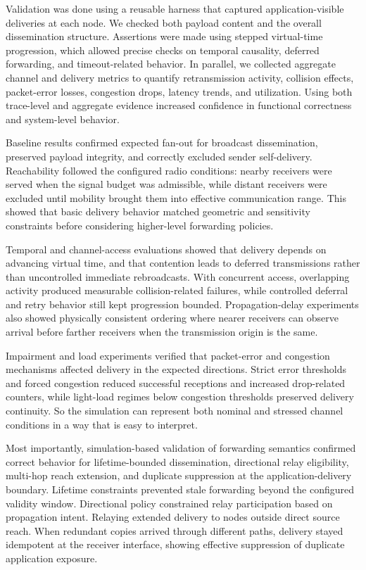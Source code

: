 Validation was done using a reusable harness that captured application-visible deliveries at each node. We
checked both payload content and the overall dissemination structure. Assertions were made using stepped
virtual-time progression, which allowed precise checks on temporal causality, deferred forwarding, and
timeout-related behavior. In parallel, we collected aggregate channel and delivery metrics to quantify
retransmission activity, collision effects, packet-error losses, congestion drops, latency trends, and
utilization. Using both trace-level and aggregate evidence increased confidence in functional correctness and
system-level behavior.

Baseline results confirmed expected fan-out for broadcast dissemination, preserved payload integrity, and
correctly excluded sender self-delivery. Reachability followed the configured radio conditions: nearby
receivers were served when the signal budget was admissible, while distant receivers were excluded until
mobility brought them into effective communication range. This showed that basic delivery behavior matched
geometric and sensitivity constraints before considering higher-level forwarding policies.

Temporal and channel-access evaluations showed that delivery depends on advancing virtual time, and that
contention leads to deferred transmissions rather than uncontrolled immediate rebroadcasts. With concurrent
access, overlapping activity produced measurable collision-related failures, while controlled deferral and
retry behavior still kept progression bounded. Propagation-delay experiments also showed physically consistent
ordering where nearer receivers can observe arrival before farther receivers when the transmission origin is
the same.

Impairment and load experiments verified that packet-error and congestion mechanisms affected delivery in the
expected directions. Strict error thresholds and forced congestion reduced successful receptions and increased
drop-related counters, while light-load regimes below congestion thresholds preserved delivery continuity.
So the simulation can represent both nominal and stressed channel conditions in a way that is easy to
interpret.

Most importantly, simulation-based validation of forwarding semantics confirmed correct behavior for
lifetime-bounded dissemination, directional relay eligibility, multi-hop reach extension, and duplicate
suppression at the application-delivery boundary. Lifetime constraints prevented stale forwarding beyond the
configured validity window. Directional policy constrained relay participation based on propagation intent.
Relaying extended delivery to nodes outside direct source reach. When redundant copies arrived through
different paths, delivery stayed idempotent at the receiver interface, showing effective suppression of
duplicate application exposure.

